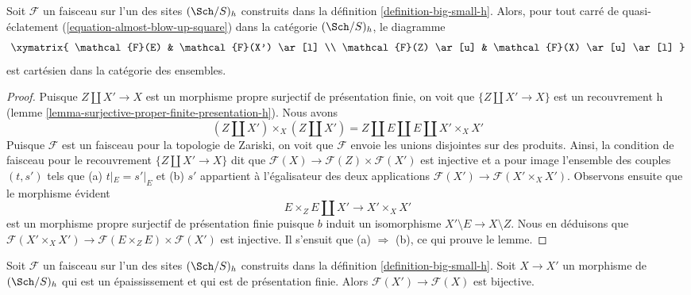 \begin{lemma}
\label{lemma-blow-up-square-h}
Soit $\mathcal{F}$ un faisceau sur l'un des sites $(\Sch/S)_h$
construits dans la définition \ref{definition-big-small-h}.
Alors, pour tout carré de quasi-éclatement (\ref{equation-almost-blow-up-square})
dans la catégorie $(\Sch/S)_h$, le diagramme
$$
\xymatrix{
\mathcal{F}(E) & \mathcal{F}(X') \ar[l] \\
\mathcal{F}(Z) \ar[u] & \mathcal{F}(X) \ar[u] \ar[l]
}
$$
est cartésien dans la catégorie des ensembles.
\end{lemma}

\begin{proof}
Puisque $Z \amalg X' \to X$ est un morphisme propre surjectif
de présentation finie, on voit que $\{Z \amalg X' \to X\}$ est un recouvrement h
(lemme \ref{lemma-surjective-proper-finite-presentation-h}).
Nous avons
$$
(Z \amalg X') \times_X (Z \amalg X') =
Z \amalg E \amalg E \amalg X' \times_X X'
$$
Puisque $\mathcal{F}$ est un faisceau pour la topologie de Zariski, on voit que
$\mathcal{F}$ envoie les unions disjointes sur des produits.
Ainsi, la condition de faisceau pour le recouvrement
$\{Z \amalg X' \to X\}$ dit que
$\mathcal{F}(X) \to \mathcal{F}(Z) \times \mathcal{F}(X')$
est injective et a pour image l'ensemble des couples $(t, s')$ tels que
(a) $t|_E = s'|_E$ et (b) $s'$ appartient à l'égalisateur des deux applications
$\mathcal{F}(X') \to \mathcal{F}(X' \times_X X')$.
Observons ensuite que le morphisme évident
$$
E \times_Z E \amalg X' \longrightarrow X' \times_X X'
$$
est un morphisme propre surjectif de présentation finie puisque $b$ induit
un isomorphisme $X' \setminus E \to X \setminus Z$. Nous en déduisons que
$\mathcal{F}(X' \times_X X') \to
\mathcal{F}(E \times_Z E) \times \mathcal{F}(X')$ est injective.
Il s'ensuit que (a) $\Rightarrow$ (b), ce qui prouve le lemme.
\end{proof}

\begin{lemma}
\label{lemma-thickening-h}
Soit $\mathcal{F}$ un faisceau sur l'un des sites $(\Sch/S)_h$
construits dans la définition \ref{definition-big-small-h}.
Soit $X \to X'$ un morphisme de $(\Sch/S)_h$ qui est
un épaississement et qui est de présentation finie. Alors
$\mathcal{F}(X') \to \mathcal{F}(X)$ est bijective.
\end{lemma}

